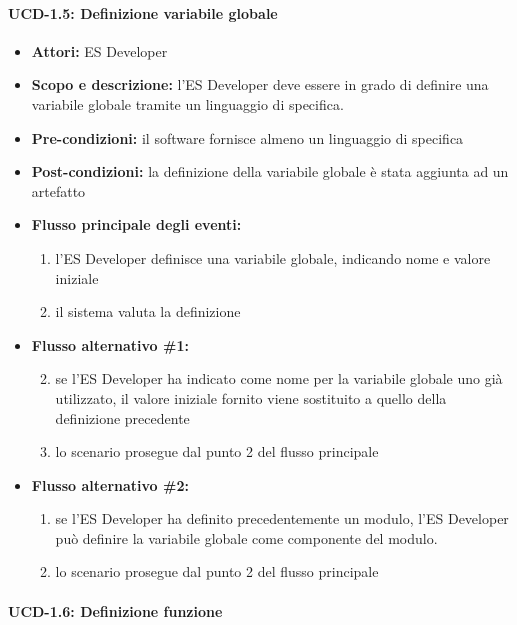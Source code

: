 \paragraph{UCD-1.5: Definizione variabile globale} %

\begin{itemize}
	\item \textbf{Attori:} ES Developer
	\item \textbf{Scopo e descrizione:}  l'ES Developer deve essere in grado di definire una variabile globale tramite un linguaggio di specifica.
	\item \textbf{Pre-condizioni:} il software fornisce almeno un linguaggio di specifica
	\item \textbf{Post-condizioni:} la definizione della variabile globale è stata aggiunta ad un artefatto
	\item \textbf{Flusso principale degli eventi:}
		\begin{enumerate}
			\item l'ES Developer definisce una variabile globale, indicando nome e valore iniziale
			\item il sistema valuta la definizione
		\end{enumerate}
	\item \textbf{Flusso alternativo \#1:} 
		\begin{enumerate}
			\setcounter{enumi}{1}
			\item se l'ES Developer ha indicato come nome per la variabile globale uno già utilizzato, il valore iniziale fornito viene sostituito a quello della definizione precedente
			\item lo scenario prosegue dal punto 2 del flusso principale
		\end{enumerate}
	\item \textbf{Flusso alternativo \#2:} 
		\begin{enumerate}
			\item se l'ES Developer ha definito precedentemente un modulo, l'ES Developer può definire la variabile globale come componente del modulo.
			\item lo scenario prosegue dal punto 2 del flusso principale
		\end{enumerate}
\end{itemize}

\paragraph{UCD-1.6: Definizione funzione} %

